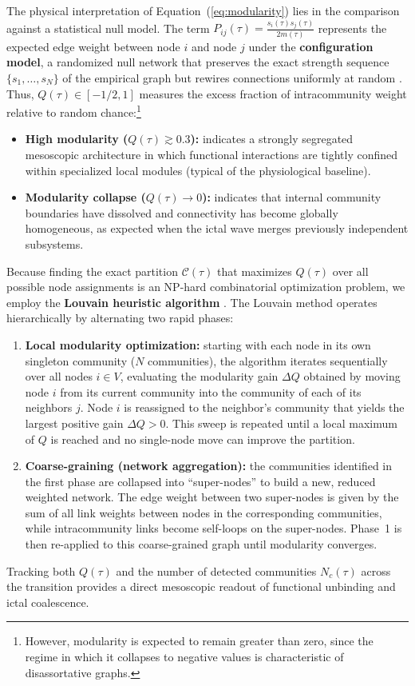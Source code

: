 The physical interpretation of Equation~(\ref{eq:modularity}) lies in the comparison against a statistical null model. The term $P_{ij}(\tau) = \frac{s_i(\tau) s_j(\tau)}{2m(\tau)}$ represents the expected edge weight between node $i$ and node $j$ under the \textbf{configuration model}, a randomized null network that preserves the exact strength sequence $\{s_1, \dots, s_N\}$ of the empirical graph but rewires connections uniformly at random \cite{newman2018networks, barabasi2016network}. Thus, $Q(\tau) \in [-1/2, 1]$ measures the excess fraction of intracommunity weight relative to random chance:\footnote{However, modularity is expected to remain greater than zero, since the regime in which it collapses to negative values is characteristic of disassortative graphs.}
\begin{itemize}
    \item \textbf{High modularity ($Q(\tau) \gtrsim 0.3$):} indicates a strongly segregated mesoscopic architecture in which functional interactions are tightly confined within specialized local modules (typical of the physiological baseline).
    \item \textbf{Modularity collapse ($Q(\tau) \to 0$):} indicates that internal community boundaries have dissolved and connectivity has become globally homogeneous, as expected when the ictal wave merges previously independent subsystems.
\end{itemize}

Because finding the exact partition $\mathcal{C}(\tau)$ that maximizes $Q(\tau)$ over all possible node assignments is an NP-hard combinatorial optimization problem, we employ the \textbf{Louvain heuristic algorithm} \cite{blondel2008fast}. The Louvain method operates hierarchically by alternating two rapid phases:
\begin{enumerate}
    \item \textbf{Local modularity optimization:} starting with each node in its own singleton community ($N$ communities), the algorithm iterates sequentially over all nodes $i \in V$, evaluating the modularity gain $\Delta Q$ obtained by moving node $i$ from its current community into the community of each of its neighbors $j$. Node $i$ is reassigned to the neighbor's community that yields the largest positive gain $\Delta Q > 0$. This sweep is repeated until a local maximum of $Q$ is reached and no single-node move can improve the partition.
    \item \textbf{Coarse-graining (network aggregation):} the communities identified in the first phase are collapsed into ``super-nodes'' to build a new, reduced weighted network. The edge weight between two super-nodes is given by the sum of all link weights between nodes in the corresponding communities, while intracommunity links become self-loops on the super-nodes. Phase~1 is then re-applied to this coarse-grained graph until modularity converges.
\end{enumerate}
Tracking both $Q(\tau)$ and the number of detected communities $N_c(\tau)$ across the transition provides a direct mesoscopic readout of functional unbinding and ictal coalescence.

